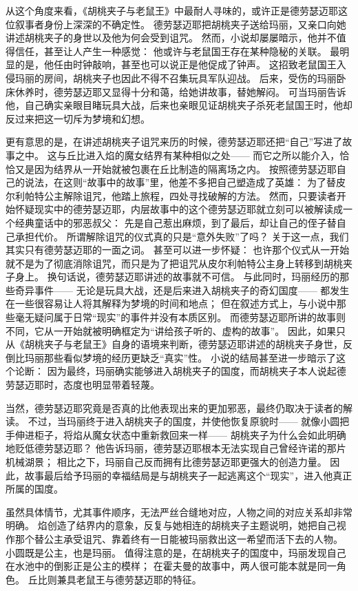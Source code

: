 从这个角度来看，《胡桃夹子与老鼠王》中最耐人寻味的，或许正是德劳瑟迈耶这位叙事者身份上深深的不确定性。
德劳瑟迈耶把胡桃夹子送给玛丽，又亲口向她讲述胡桃夹子的身世以及他为何会受到诅咒。
然而，小说却屡屡暗示，他并不值得信任，甚至让人产生一种感觉：
他或许与老鼠国王存在某种隐秘的关联。
最明显的是，他任由时钟敲响，甚至也可以说正是他促成了钟声。
这招致老鼠国王入侵玛丽的房间，胡桃夹子也因此不得不召集玩具军队迎战。
后来，受伤的玛丽卧床休养时，德劳瑟迈耶又显得十分和蔼，给她讲故事，替她解闷。
可当玛丽告诉他，自己确实亲眼目睹玩具大战，后来也亲眼见证胡桃夹子杀死老鼠国王时，他却反过来把这一切斥为梦境和幻想。


更有意思的是，在讲述胡桃夹子诅咒来历的时候，德劳瑟迈耶还把“自己”写进了故事之中。
这与丘比进入焰的魔女结界有某种相似之处——
而它之所以能介入，恰恰又是因为结界从一开始就被包裹在丘比制造的隔离场之内。
按照德劳瑟迈耶自己的说法，在这则“故事中的故事”里，他差不多把自己塑造成了英雄：
为了替皮尔利帕特公主解除诅咒，他踏上旅程，四处寻找破解的方法。
然而，只要读者开始怀疑现实中的德劳瑟迈耶，内层故事中的这个德劳瑟迈耶就立刻可以被解读成一个经典童话中的邪恶叔父：
先是自己惹出麻烦，到了最后，却让自己的侄子替自己承担代价。
所谓解除诅咒的仪式真的只是“意外失败”了吗？
关于这一点，我们其实只有德劳瑟迈耶的一面之词。
甚至可以进一步怀疑：
也许那个仪式从一开始就不是为了彻底消除诅咒，而只是为了把诅咒从皮尔利帕特公主身上转移到胡桃夹子身上。
换句话说，德劳瑟迈耶讲述的故事就不可信。
与此同时，玛丽经历的那些奇异事件——
无论是玩具大战，还是后来进入胡桃夹子的奇幻国度——
都发生在一些很容易让人将其解释为梦境的时间和地点；
但在叙述方式上，与小说中那些毫无疑问属于日常“现实”的事件并没有本质区别。
而德劳瑟迈耶所讲的故事则不同，它从一开始就被明确框定为“讲给孩子听的、虚构的故事”。
因此，如果只从《胡桃夹子与老鼠王》自身的语境来判断，德劳瑟迈耶讲述的胡桃夹子身世，反倒比玛丽那些看似梦境的经历更缺乏“真实”性。
小说的结局甚至进一步暗示了这个论断：
因为最终，玛丽确实能够进入胡桃夹子的国度，而胡桃夹子本人说起德劳瑟迈耶时，态度也明显带着轻蔑。

当然，德劳瑟迈耶究竟是否真的比他表现出来的更加邪恶，最终仍取决于读者的解读。
不过，当玛丽终于进入胡桃夹子的国度，并使他恢复原貌时——
就像小圆把手伸进柜子，将焰从魔女状态中重新救回来一样——
胡桃夹子为什么会如此明确地贬低德劳瑟迈耶？
他告诉玛丽，德劳瑟迈耶根本无法实现自己曾经许诺的那片机械湖景；
相比之下，玛丽自己反而拥有比德劳瑟迈耶更强大的创造力量。
因此，故事最后给予玛丽的幸福结局是与胡桃夹子一起逃离这个“现实”，进入他真正所属的国度。

虽然具体情节，尤其事件顺序，无法严丝合缝地对应，人物之间的对应关系却非常明确。
焰创造了结界内的意象，反复与她相连的胡桃夹子主题说明，她把自己视作那个替公主承受诅咒、靠着终有一日能被玛丽救出这一希望而活下去的人物。
小圆既是公主，也是玛丽。
值得注意的是，在胡桃夹子的国度中，玛丽发现自己在水池中的倒影正是公主的模样；
在霍夫曼的故事中，两人很可能本就是同一角色。
丘比则兼具老鼠王与德劳瑟迈耶的特征。

